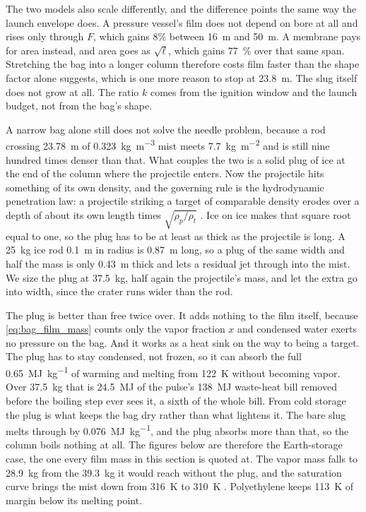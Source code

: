 \documentclass{article}
\begin{document}
The two models also scale differently, and the difference points the same way the launch envelope does. A pressure vessel's film does not depend on bore at all and rises only through $F$, which gains 8\% between \SI{16}{\meter} and \SI{50}{\meter}. A membrane pays for area instead, and area goes as $\sqrt{\ell}$, which gains \SI{77}{\percent} over that same span. Stretching the bag into a longer column therefore costs film faster than the shape factor alone suggests, which is one more reason to stop at \SI{23.8}{\meter}. The slug itself does not grow at all. The ratio $k$ comes from the ignition window and the launch budget, not from the bag's shape.

A narrow bag alone still does not solve the needle problem, because a rod crossing \SI{23.78}{\meter} of \SI{0.323}{\kilogram\per\cubic\meter} mist meets \SI{7.7}{\kilogram\per\square\meter} and is still nine hundred times denser than that. What couples the two is a solid plug of ice at the end of the column where the projectile enters. Now the projectile hits something of its own density, and the governing rule is the hydrodynamic penetration law: a projectile striking a target of comparable density erodes over a depth of about its own length times $\sqrt{\rho_p/\rho_t}$ \cite{birkhoff1948lined}. Ice on ice makes that square root equal to one, so the plug has to be at least as thick as the projectile is long. A \SI{25}{\kilogram} ice rod \SI{0.1}{\meter} in radius is \SI{0.87}{\meter} long, so a plug of the same width and half the mass is only \SI{0.43}{\meter} thick and lets a residual jet through into the mist. We size the plug at \SI{37.5}{\kilogram}, half again the projectile's mass, and let the extra go into width, since the crater runs wider than the rod.

The plug is better than free twice over. It adds nothing to the film itself, because \autoref{eq:bag_film_mass} counts only the vapor fraction $x$ and condensed water exerts no pressure on the bag. And it works as a heat sink on the way to being a target. The plug has to stay condensed, not frozen, so it can absorb the full \SI{0.65}{\mega\joule\per\kilogram} of warming and melting from \SI{122}{\kelvin} without becoming vapor. Over \SI{37.5}{\kilogram} that is \SI{24.5}{\mega\joule} of the pulse's \SI{138}{\mega\joule} waste-heat bill removed before the boiling step ever sees it, a sixth of the whole bill. From cold storage the plug is what keeps the bag dry rather than what lightens it. The bare slug melts through by \SI{0.076}{\mega\joule\per\kilogram}, and the plug absorbs more than that, so the column boils nothing at all. The figures below are therefore the Earth-storage case, the one every film mass in this section is quoted at. The vapor mass falls to \SI{28.9}{\kilogram} from the \SI{39.3}{\kilogram} it would reach without the plug, and the saturation curve brings the mist down from \SI{316}{\kelvin} to \SI{310}{\kelvin} \cite{Katz_aim_is_all_you_need_2025}. Polyethylene keeps \SI{113}{\kelvin} of margin below its melting point.
\end{document}
